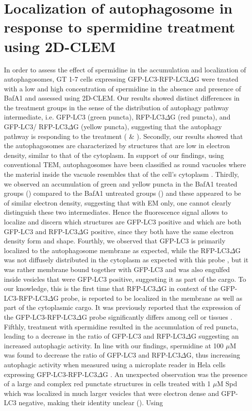 \section{Localization of autophagosome in response to spermidine treatment using 2D-CLEM}
In order to assess the effect of spermidine in the accumulation and localization of  autophagosomes, GT 1-7 cells expressing GFP-LC3-RFP-LC3$\Delta$G were treated with a low and high concentration of spermidine in the absence and presence of BafA1 and assessed using 2D-CLEM. Our results showed distinct differences in the treatment groups in the sense of the distribution of autophagy pathway intermediate, i.e. GFP-LC3 (green puncta), RFP-LC3$\Delta$G (red puncta), and GFP-LC3/ RFP-LC3$\Delta$G (yellow puncta), suggesting that the autophagy pathway is responding to the treatment ( \& ). Secondly, our results showed that the autophagosomes are characterized by structures that are low in electron density, similar to that of the cytoplasm. In support of our findings, using conventional TEM, autophagosomes have been classified as round vacuoles where the material inside the vacuole resembles that of the cell’s cytoplasm \citep{Eskelinen2008}. Thirdly, we observed an accumulation of green and yellow puncta in the BafA1 treated groups () compared to the BafA1 untreated groups () and these appeared to be of similar electron density, suggesting that with EM only, one cannot clearly distinguish these two intermediates. Hence the fluorescence signal allows to localize and discern which structures are GFP-LC3 positive and which are both GFP-LC3 and RFP-LC3$\Delta$G positive, since they both have the same electron density form and shape. Fourthly, we observed that GFP-LC3 is primarily localized to the autophagosome membrane as expected, while the RFP-LC3$\Delta$G was not diffusely distributed in the cytoplasm as expected with this probe \citep{Kaizuka2016}, but it was rather membrane bound together with GFP-LC3 and was also engulfed inside vesicles that were GFP-LC3 positive, suggesting it as part of the cargo. To our knowledge, this is the first time that RFP-LC3$\Delta$G in context of the GFP-LC3-RFP-LC3$\Delta$G probe, is reported to be localized in the membrane as well as part of the cytoplasmic cargo. It was previously reported that the expression of the GFP-LC3-RFP-LC3$\Delta$G probe significantly differs among cell or tissues \citep{MoulisandVindis2017}. Fifthly, treatment with spermidine resulted in the accumulation of red puncta, leading to a decrease in the ratio of GFP-LC3 and RFP-LC3$\Delta$G suggesting an increased autophagic activity. In line with our findings, spermidine at 100 $\mu$M was found to decrease the ratio of GFP-LC3 and RFP-LC3$\Delta$G, thus increasing autophagic activity when measured using a microplate reader in Hela cells expressing GFP-LC3-RFP-LC3$\Delta$G \citep{Kaizuka2016}. An unexpected observation was the presence of a large and complex red punctate structures in cells treated with 1 $\mu$M Spd which was localized in much larger vesicles that were electron dense and GFP-LC3 negative, making their identity unclear (). Using 